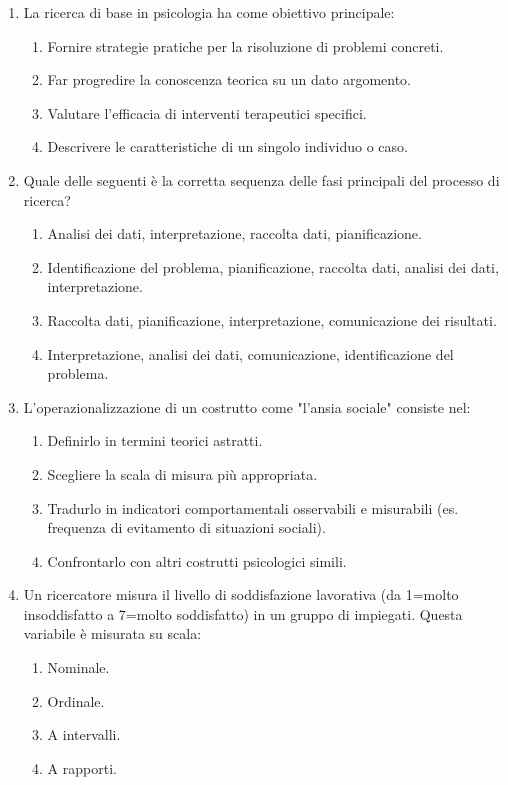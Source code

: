 \documentclass[12pt, a4paper]{article}
\begin{document}
\begin{enumerate}[resume]
    \item La ricerca di base in psicologia ha come obiettivo principale:
    \begin{enumerate}
        \item Fornire strategie pratiche per la risoluzione di problemi concreti.
        \item Far progredire la conoscenza teorica su un dato argomento.
        \item Valutare l'efficacia di interventi terapeutici specifici.
        \item Descrivere le caratteristiche di un singolo individuo o caso.
    \end{enumerate}
    \vspace{0.3cm}

    \item Quale delle seguenti è la corretta sequenza delle fasi principali del processo di ricerca?
    \begin{enumerate}
        \item Analisi dei dati, interpretazione, raccolta dati, pianificazione.
        \item Identificazione del problema, pianificazione, raccolta dati, analisi dei dati, interpretazione.
        \item Raccolta dati, pianificazione, interpretazione, comunicazione dei risultati.
        \item Interpretazione, analisi dei dati, comunicazione, identificazione del problema.
    \end{enumerate}
    \vspace{0.3cm}

    \item L'operazionalizzazione di un costrutto come "l'ansia sociale" consiste nel:
    \begin{enumerate}
        \item Definirlo in termini teorici astratti.
        \item Scegliere la scala di misura più appropriata.
        \item Tradurlo in indicatori comportamentali osservabili e misurabili (es. frequenza di evitamento di situazioni sociali).
        \item Confrontarlo con altri costrutti psicologici simili.
    \end{enumerate}
    \vspace{0.3cm}

    \item Un ricercatore misura il livello di soddisfazione lavorativa (da 1=molto insoddisfatto a 7=molto soddisfatto) in un gruppo di impiegati. Questa variabile è misurata su scala:
    \begin{enumerate}
        \item Nominale.
        \item Ordinale.
        \item A intervalli.
        \item A rapporti.
    \end{enumerate}
    \vspace{0.3cm}


\end{enumerate}
\end{document}
